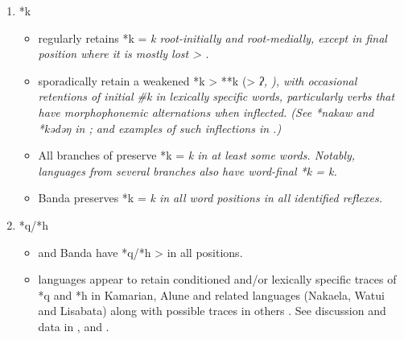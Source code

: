\begin{enumerate}
		\begin{itemize}[topsep=0pt,leftmargin=\dimexpr 15pt-6pt]
			\item	{} retains *ŋ = \it{ŋ} root initially
						and medially, but in final position it merges *n/*ŋ > \it{n}{\#}
						in words in which it is retained rather than lost.
			\item	{}
						and Banda merge *n/*ñ/*ŋ > \it{n} in all positions.
			\item	{} reflexes of *ŋ are diverse including:
						\it{ŋ, g, k, ŋg} and \it{n}.
						Notably,  languages (those closest to )
						have medial *ŋ > \it{k}
						and thus do not pattern with  with respect to the nasals.
		\end{itemize}
	\item	*k
		\begin{itemize}[topsep=0pt,leftmargin=\dimexpr 15pt-6pt]
			\item	{} regularly retains *k = \it{k} root-initially
						and root-medially, except in final position where it is mostly lost > {\0}.
			\item	{} sporadically retain a weakened *k > **k (>
						\it{ʔ}, {\0}), with occasional retentions of initial {\#}\it{k} in lexically
						specific words, particularly verbs that have morphophonemic alternations when inflected.
						(See *nakaw and *kədəŋ in ;
						and examples of such inflections in .)
			\item	All branches of  preserve *k =
						\it{k} in at least some words.
						Notably, languages from several branches also have word-final *k = \it{k}.
			\item	Banda preserves *k = \it{k} in all word positions in all identified reflexes.
		\end{itemize}
	\item	*q/*h
		\begin{itemize}[topsep=0pt,leftmargin=\dimexpr 15pt-6pt]
			\item	{}
						and Banda have *q/*h > {\0} in all positions.
			\item	{} languages appear to retain conditioned and/or
						lexically specific traces of *q
						and *h in Kamarian,
						Alune and related languages (Naka{\Q}ela,
						Watui and Lisabata) along with possible traces in others
						\citep[40--52, 133]{Collins1983}.
						See discussion and data in , and .

\end{itemize}
\end{enumerate}
